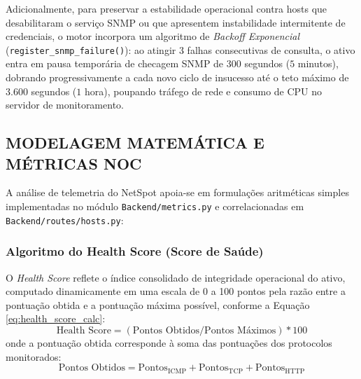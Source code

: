 \documentclass[12pt,a4paper]{article}
\begin{document}
Adicionalmente, para preservar a estabilidade operacional contra hosts que desabilitaram o serviço SNMP ou que apresentem instabilidade intermitente de credenciais, o motor incorpora um algoritmo de \textit{Backoff Exponencial} (\texttt{register\_snmp\_failure()}): ao atingir 3 falhas consecutivas de consulta, o ativo entra em pausa temporária de checagem SNMP de 300 segundos ($5$ minutos), dobrando progressivamente a cada novo ciclo de insucesso até o teto máximo de 3.600 segundos ($1$ hora), poupando tráfego de rede e consumo de CPU no servidor de monitoramento.

\subsection{MODELAGEM MATEMÁTICA E MÉTRICAS NOC}
A análise de telemetria do NetSpot apoia-se em formulações aritméticas simples implementadas no módulo \texttt{Backend/metrics.py} e correlacionadas em \texttt{Backend/routes/hosts.py}:

\subsubsection{Algoritmo do Health Score (Score de Saúde)}
O \textit{Health Score} reflete o índice consolidado de integridade operacional do ativo, computado dinamicamente em uma escala de 0 a 100 pontos pela razão entre a pontuação obtida e a pontuação máxima possível, conforme a Equação \ref{eq:health_score_calc}:
\begin{equation}
\label{eq:health_score_calc}
\text{Health Score} = (\text{Pontos Obtidos} / \text{Pontos Máximos}) * 100
\end{equation}
onde a pontuação obtida corresponde à soma das pontuações dos protocolos monitorados:
\begin{equation*}
\text{Pontos Obtidos} = \text{Pontos}_{\text{ICMP}} + \text{Pontos}_{\text{TCP}} + \text{Pontos}_{\text{HTTP}}
\end{equation*}
\end{document}
